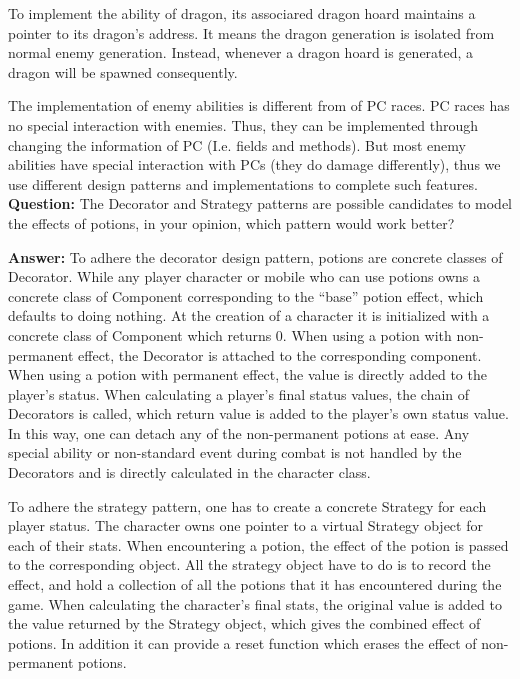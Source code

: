 \documentclass[11pt]{article}
\theoremstyle{plain} \newtheorem{theorem*}{Theorem}[subsection]
\begin{document}
To implement the ability of dragon, its associared dragon hoard maintains a
pointer to its dragon’s address. It means the dragon generation is isolated
from normal enemy generation. Instead, whenever a dragon hoard is generated, a
dragon will be spawned consequently.  

The implementation of enemy abilities is different from of PC races. PC races
has no special interaction with enemies. Thus, they can be implemented through
changing the information of PC (I.e. fields and methods). But most enemy
abilities have special interaction with PCs (they do damage differently), thus
we use different design patterns and implementations to complete such features. \\


\textbf{Question:}
The Decorator and Strategy patterns are possible candidates to model the
effects of potions, in your opinion, which pattern would work better? 

\textbf{Answer:}
To adhere the decorator design pattern, potions are concrete classes of
Decorator. While any player character or mobile who can use potions owns a
concrete class of Component corresponding to the “base” potion effect, which
defaults to doing nothing. At the creation of a character it is initialized
with a concrete class of Component which returns 0. When using a potion with
non-permanent effect, the Decorator is attached to the corresponding component.
When using a potion with permanent effect, the value is directly added to the
player’s status. When calculating a player’s final status values, the chain of
Decorators is called, which return value is added to the player’s own status
value. In this way, one can detach any of the non-permanent potions at ease.
Any special ability or non-standard event during combat is not handled by the
Decorators and is directly calculated in the character class. 

To adhere the strategy pattern, one has to create a concrete Strategy for each
player status. The character owns one pointer to a virtual Strategy object for
each of their stats. When encountering a potion, the effect of the potion is
passed to the corresponding object. All the strategy object have to do is to
record the effect, and hold a collection of all the potions that it has
encountered during the game. When calculating the character’s final stats, the
original value is added to the value returned by the Strategy object, which
gives the combined effect of potions. In addition it can provide a reset
function which erases the effect of non-permanent potions.  
\end{document}
